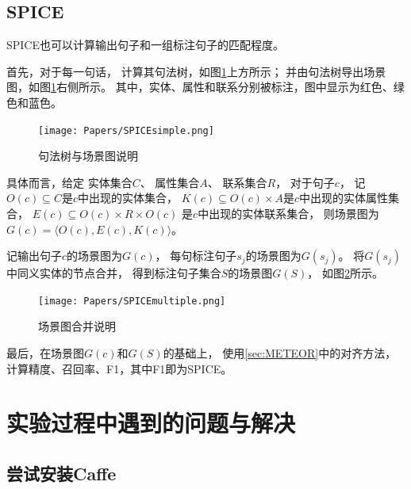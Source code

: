 \documentclass[12pt]{article}
\begin{document}
\subsection{SPICE}

SPICE也可以计算输出句子和一组标注句子的匹配程度。

首先，对于每一句话，
计算其句法树，如图\ref{fig:SPICEsimple}上方所示；
并由句法树导出场景图，如图\ref{fig:SPICEsimple}右侧所示。
其中，实体、属性和联系分别被标注，图中显示为红色、绿色和蓝色。

\begin{figure}[h]
	\centering
	\texttt{[image: Papers/SPICEsimple.png]}
	\caption{句法树与场景图说明}
	\label{fig:SPICEsimple}
\end{figure}

具体而言，给定
实体集合$C$、
属性集合$A$、
联系集合$R$，
对于句子$c$，
记$O(c) \subseteq C$是$c$中出现的实体集合，
$K(c) \subseteq O(c) \times A$是$c$中出现的实体属性集合，
$E(c) \subseteq O(c) \times R \times O(c)$
是$c$中出现的实体联系集合，
则场景图为$G(c) = \langle O(c), E(c), K(c) \rangle$。

记输出句子$c$的场景图为$G(c)$，
每句标注句子$s_j$的场景图为$G(s_j)$。
将$G(s_j)$中同义实体的节点合并，
得到标注句子集合$S$的场景图$G(S)$，
如图\ref{fig:SPICEmultiple}所示。

\begin{figure}[h]
	\centering
	\texttt{[image: Papers/SPICEmultiple.png]}
	\caption{场景图合并说明}
	\label{fig:SPICEmultiple}
\end{figure}

最后，在场景图$G(c)$和$G(S)$的基础上，
使用\ref{sec:METEOR}中的对齐方法，
计算精度、召回率、F1，其中F1即为SPICE。

\section{实验过程中遇到的问题与解决}

\subsection{尝试安装Caffe}
\end{document}
